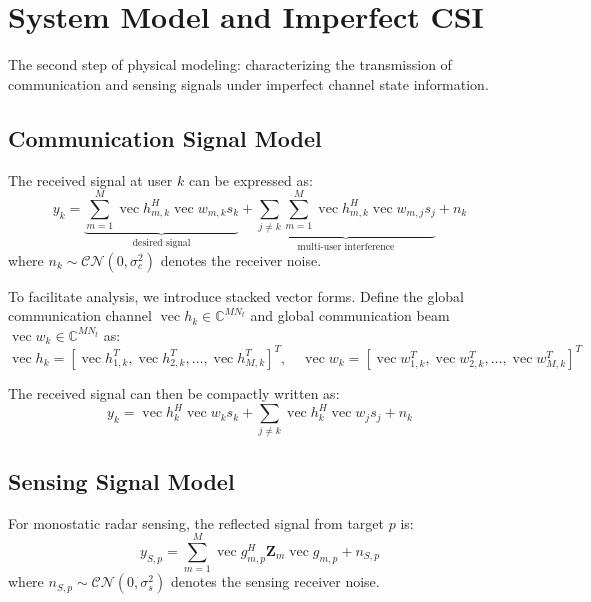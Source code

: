 \documentclass[12pt,a4paper]{article}
\DeclareMathOperator{\vect}{vec}
\newcommand{\mat}[1]{\mathbf{#1}}
\begin{document}
\section{System Model and Imperfect CSI}

The second step of physical modeling: characterizing the transmission of communication and sensing signals under imperfect channel state information.

\subsection{Communication Signal Model}

The received signal at user $k$ can be expressed as:
\begin{equation}
y_k = \underbrace{\sum_{m=1}^M \vect{h}_{m,k}^H \vect{w}_{m,k} s_k}_{\text{desired signal}} + \underbrace{\sum_{j \neq k} \sum_{m=1}^M \vect{h}_{m,k}^H \vect{w}_{m,j} s_j}_{\text{multi-user interference}} + n_k
\end{equation}
where $n_k \sim \mathcal{CN}(0, \sigma_c^2)$ denotes the receiver noise.

To facilitate analysis, we introduce stacked vector forms. Define the global communication channel $\vect{h}_k \in \mathbb{C}^{MN_t}$ and global communication beam $\vect{w}_k \in \mathbb{C}^{MN_t}$ as:
\begin{equation}
\vect{h}_k = [\vect{h}_{1,k}^T, \vect{h}_{2,k}^T, \ldots, \vect{h}_{M,k}^T]^T, \quad
\vect{w}_k = [\vect{w}_{1,k}^T, \vect{w}_{2,k}^T, \ldots, \vect{w}_{M,k}^T]^T
\end{equation}

The received signal can then be compactly written as:
\begin{equation}
y_k = \vect{h}_k^H \vect{w}_k s_k + \sum_{j \neq k} \vect{h}_k^H \vect{w}_j s_j + n_k
\end{equation}

\subsection{Sensing Signal Model}

For monostatic radar sensing, the reflected signal from target $p$ is:
\begin{equation}
y_{S,p} = \sum_{m=1}^M \vect{g}_{m,p}^H \mat{Z}_m \vect{g}_{m,p} + n_{S,p}
\end{equation}
where $n_{S,p} \sim \mathcal{CN}(0, \sigma_s^2)$ denotes the sensing receiver noise.
\end{document}
